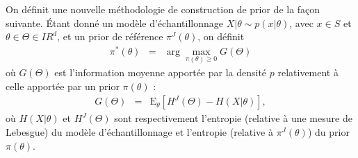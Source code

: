 \documentclass[10pt]{article}
\newcommand{\R}{I\!\!R}
\newcommand{\E}{\mbox{E}}
\newcommand{\1}{\mathbbm{1}}
\begin{document}
On d\'efinit une nouvelle m\'ethodologie de construction de prior de la fa\c con suivante. \'Etant donn\'e un mod\`ele d'\'echantillonnage $X|\theta \sim p(x|\theta)$, avec $x\in S$ et $\theta\in\Theta\in\R^d$, et un prior de r\'ef\'erence $\pi^J(\theta)$, on d\'efinit
\begin{eqnarray}
\pi^*(\theta) & = & \arg\max\limits_{\pi(\theta)\geq 0} G(\Theta) \label{mdiprior}
\end{eqnarray}
o\`u $G(\Theta)$ est l'information moyenne apport\'ee par la densit\'e $p$ relativement \`a celle apport\'ee par un prior $\pi(\theta)$ :
\begin{eqnarray*}
G(\Theta) & = & \E_{\theta}\left[H^J(\Theta) - H(X|\theta)\right],
\end{eqnarray*}
o\`u $H(X|\theta)$ et
$H^J(\Theta)$ sont respectivement l'entropie (relative \`a une mesure de Lebesgue) du mod\`ele d'\'echantillonnage et l'entropie (relative \`a $\pi^J(\theta)$) du prior $\pi(\theta)$. 
\end{document}
